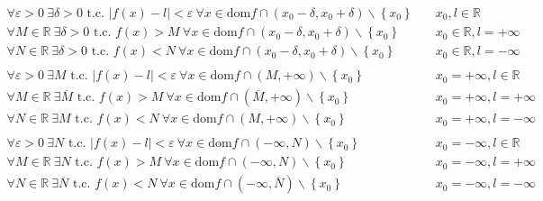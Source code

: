 \documentclass[a4paper]{article}
\newcommand\dom{\text{dom}}
\begin{document}
\begin{align*}
		\forall \varepsilon > 0 \  \exists \delta > 0 \text{ t.c. } \left| f(x) - l \right| < \varepsilon \  \forall x \in \dom f \cap \left( x_0 - \delta, x_0 + \delta \right) \backslash \left\{ x_0 \right\} \quad & x_0, l \in \mathbb{R} \\
		\forall M \in \mathbb{R} \  \exists \delta > 0 \text{ t.c. } f(x) > M \  \forall x \in \dom f \cap \left( x_0 - \delta, x_0 + \delta \right) \backslash \left\{ x_0 \right\} \quad & x_0 \in \mathbb{R}, l = + \infty \\
		\forall N \in \mathbb{R} \  \exists \delta > 0 \text{ t.c. } f(x) < N \  \forall x \in \dom f \cap \left( x_0 - \delta, x_0 + \delta \right) \backslash \left\{ x_0 \right\} \quad & x_0 \in \mathbb{R}, l = - \infty \\
		\\
		\forall \varepsilon > 0 \  \exists M \text{ t.c. } \left| f(x) - l \right| < \varepsilon \  \forall x \in \dom f \cap \left( M, + \infty \right) \backslash \left\{ x_0 \right\} \quad & x_0 = + \infty, l \in \mathbb{R} \\
		\forall M \in \mathbb{R} \  \exists \overline{M} \text{ t.c. } f(x) > M \  \forall x \in \dom f \cap \left( \overline{M}, + \infty \right) \backslash \left\{ x_0 \right\} \quad & x_0 = + \infty, l = + \infty \\
		\forall N \in \mathbb{R} \  \exists M \text{ t.c. } f(x) < N \  \forall x \in \dom f \cap \left( M, + \infty \right) \backslash \left\{ x_0 \right\} \quad & x_0 = + \infty, l = - \infty \\
		\\
		\forall \varepsilon > 0 \  \exists N \text{ t.c. } \left| f(x) - l \right| < \varepsilon \  \forall x \in \dom f \cap \left( - \infty, N \right) \backslash \left\{ x_0 \right\} \quad & x_0 = - \infty, l \in \mathbb{R} \\
		\forall M \in \mathbb{R} \  \exists N \text{ t.c. } f(x) > M \  \forall x \in \dom f \cap \left( - \infty, N \right) \backslash \left\{ x_0 \right\} \quad & x_0 = - \infty, l = + \infty \\
		\forall N \in \mathbb{R} \  \exists \overline{N} \text{ t.c. } f(x) < N \  \forall x \in \dom f \cap \left( - \infty, \overline{N} \right) \backslash \left\{ x_0 \right\} \quad & x_0 = - \infty, l = - \infty
\end{align*}
\end{document}
